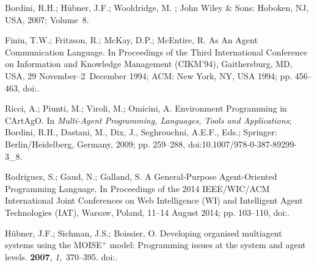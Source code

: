 \documentclass[jsan,article,accept,moreauthors,pdftex]{Definitions/mdpi}
\begin{document}
\begin{thebibliography}{999}
Bordini, R.H.; H{\"u}bner, J.F.; Wooldridge, M.
;
   John Wiley \& Sons:  Hoboken, NJ, USA, %
  2007; Volume~8.

Finin, T.W.; Fritzson, R.; McKay, D.P.; McEntire, R.
 As An Agent Communication Language.
\newblock  In Proceedings of the Third International Conference on Information and
  Knowledge Management (CIKM'94), Gaithersburg, MD, USA, 29 November--\mbox{2 December} 1994; ACM: New York, NY, USA %
 1994; pp. 456--463,
\newblock
  doi:{\href{https://doi.org/10.1145/191246.191322}{}}.

Ricci, A.; Piunti, M.; Viroli, M.; Omicini, A.
\newblock Environment Programming in CArtAgO. In {\em Multi-Agent Programming,
  Languages, Tools and Applications}; Bordini, R.H., Dastani, M., Dix, J.,
  Seghrouchni, A.E.F., Eds.; Springer:  Berlin/Heidelberg, Germany, %
 2009; pp. 259--288,
\newblock
  doi:10.1007/978-0-387-89299-3\_8.

Rodriguez, S.; Gaud, N.; Galland, S.
 {A} General-Purpose Agent-Oriented Programming Language.
\newblock  In Proceedings of the 2014 {IEEE/WIC/ACM} International Joint Conferences on Web
  Intelligence {(WI)} and Intelligent Agent Technologies (IAT), Warsaw, Poland,
 11--14 August 2014;  pp.
  103--110,
\newblock
  doi:{\href{https://doi.org/10.1109/WI-IAT.2014.156}{}}.

H{\"{u}}bner, J.F.; Sichman, J.S.; Boissier, O.
\newblock Developing organised multiagent systems using the
  MOISE\({}^{\mbox{+}}\) model: Programming issues at the system and agent
  levels.
 {\bf 2007}, {\em
  1},~370--395.
\newblock
  doi:{\href{https://doi.org/10.1504/IJAOSE.2007.016266}{}}.


\end{thebibliography}
\end{document}

